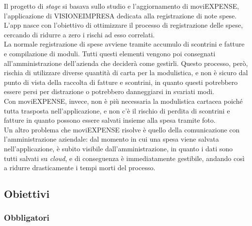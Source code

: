 \noindent Il progetto di \textit{stage} si basava sullo studio e l'aggiornamento di moviEXPENSE, l'applicazione di VISIONEIMPRESA dedicata alla registrazione di note spese. L'app nasce con l'obiettivo di ottimizzare il processo di registrazione delle spese, cercando di ridurre a zero i rischi ad esso correlati.\\
La normale registrazione di spese avviene tramite accumulo di scontrini e fatture e compilazione di moduli. Tutti questi elementi vengono poi consegnati all'amministrazione dell'azienda che deciderà come gestirli. Questo processo, però, rischia di utilizzare diverse quantità di carta per la modulistica, e non è sicuro dal punto di vista della raccolta di fatture e scontrini, in quanto questi potrebbero essere persi per distrazione o potrebbero danneggiarsi in svariati modi.\\
Con moviEXPENSE, invece, non è più necessaria la modulistica cartacea poiché tutta trasposta nell'applicazione, e non c'è il rischio di perdita di scontrini e fatture in quanto possono essere salvati insieme alla spesa tramite foto.\\
Un altro problema che moviEXPENSE risolve è quello della comunicazione con l'amministrazione aziendale: dal momento in cui una spesa viene salvata nell'applicazione, è subito visibile dall'amministrazione, in quanto i dati sono tutti salvati su \textit{cloud}, e di conseguenza è immediatamente gestibile, andando così a ridurre drasticamente i tempi morti del processo.

\subsection{Obiettivi}
\label{cap:obiettivi}
\subsubsection{Obbligatori}

